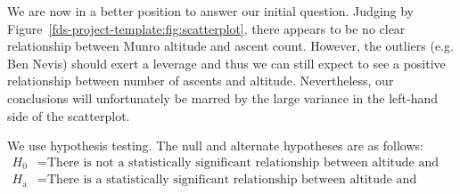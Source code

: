 \documentclass[11pt,a4paper]{article}
\begin{document}
We are now in a better position to answer our initial question. Judging by Figure~\ref{fds-project-template:fig:scatterplot}, there appears to be no clear relationship between Munro altitude and ascent count. However, the outliers (e.g. Ben Nevis) should exert a leverage and thus we can still expect to see a positive relationship between number of ascents and altitude. Nevertheless, our conclusions will unfortunately be marred by the large variance in the left-hand side of the scatterplot.

We use hypothesis testing. The null and alternate hypotheses are as follows:
\begin{align*}
    H_0 &= \text{There is not a statistically significant relationship between altitude and number of ascents.}\\
    H_\text{a} &= \text{There is a statistically significant relationship between altitude and number of ascents.}
\end{align*}
\end{document}
